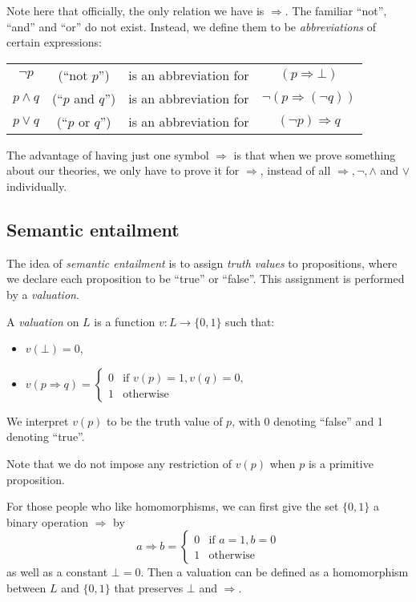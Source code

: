 \documentclass[a4paper]{article}
\begin{document}
Note here that officially, the only relation we have is $\Rightarrow$. The familiar ``not'', ``and'' and ``or'' do not exist. Instead, we define them to be \emph{abbreviations} of certain expressions:
\begin{defi}\leavevmode
  \begin{center}
    \begin{tabular}{cccc}
      $\neg p$ & (``not $p$'') & is an abbreviation for & $(p\Rightarrow \bot)$\\
      $p\wedge q$ & (``$p$ and $q$'') & is an abbreviation for & $\neg(p\Rightarrow (\neg q))$\\
      $p\vee q$ & (``$p$ or $q$'') & is an abbreviation for & $(\neg p)\Rightarrow q$
    \end{tabular}
  \end{center}
\end{defi}
The advantage of having just one symbol $\Rightarrow $ is that when we prove something about our theories, we only have to prove it for $\Rightarrow $, instead of all $\Rightarrow , \neg, \wedge$ and $\vee$ individually.
\subsection{Semantic entailment}
The idea of \emph{semantic entailment} is to assign \emph{truth values} to propositions, where we declare each proposition to be ``true'' or ``false''. This assignment is performed by a \emph{valuation}.

\begin{defi}[Valuation]
  A \emph{valuation} on $L$ is a function $v: L\to \{0, 1\}$ such that:
  \begin{itemize}
  \item $v(\bot) = 0$,
  \item $v(p\Rightarrow q) = \begin{cases} 0 & \text{if }v(p) = 1, v(q) = 0,\\1 & \text{otherwise}\end{cases}$
  \end{itemize}
  We interpret $v(p)$ to be the truth value of $p$, with 0 denoting ``false'' and 1 denoting ``true''.

  Note that we do not impose any restriction of $v(p)$ when $p$ is a primitive proposition.
\end{defi}
For those people who like homomorphisms, we can first give the set $\{0, 1\}$ a binary operation $\Rightarrow $ by
\[
  a\Rightarrow b = \begin{cases}
    0 & \text{if }a = 1, b = 0\\
    1 & \text{otherwise}
  \end{cases}
\]
as well as a constant $\bot = 0$. Then a valuation can be defined as a homomorphism between $L$ and $\{0, 1\}$ that preserves $\bot$ and $\Rightarrow $.
\end{document}
